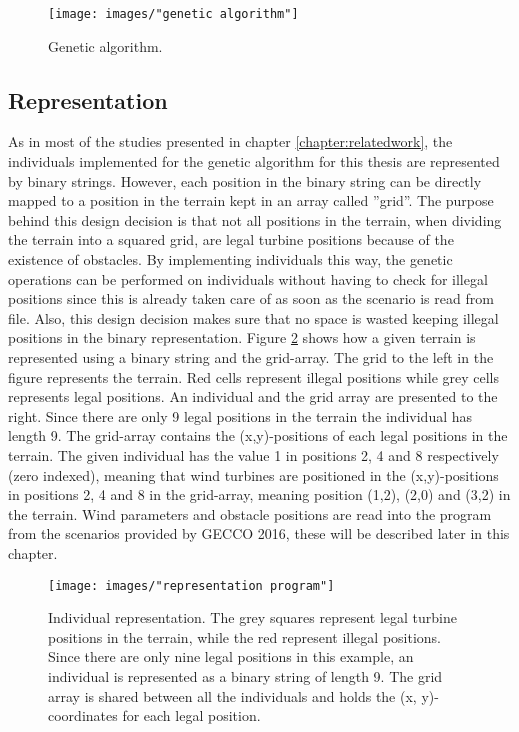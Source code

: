 \begin{figure}[h!]
\begin{center}
\texttt{[image: images/"genetic algorithm"]}
\caption{Genetic algorithm.}
\label{figure:genetic algorithm steps}
\end{center}
\end{figure}


\subsection{Representation}
As in most of the studies presented in chapter \ref{chapter:relatedwork}, the individuals implemented for the genetic algorithm for this thesis are represented by binary strings. However, each position in the binary string can be directly mapped to a position in the terrain kept in an array called ''grid''. The purpose behind this design decision is that not all positions in the terrain, when dividing the terrain into a squared grid, are legal turbine positions because of the existence of obstacles. By implementing individuals this way, the genetic operations can be performed on individuals without having to check for illegal positions since this is already taken care of as soon as the scenario is read from file. Also, this design decision makes sure that no space is wasted keeping illegal positions in the binary representation. Figure \ref{figure:representation} shows how a given terrain is represented using a binary string and the grid-array. The grid to the left in the figure represents the terrain. Red cells represent illegal positions while grey cells represents legal positions. An individual and the grid array are presented to the right. Since there are only 9 legal positions in the terrain the individual has length 9. The grid-array contains the (x,y)-positions of each legal positions in the terrain. The given individual has the value 1 in positions 2, 4 and 8 respectively (zero indexed), meaning that wind turbines are positioned in the (x,y)-positions in positions 2, 4 and 8 in the grid-array, meaning position (1,2), (2,0) and (3,2) in the terrain. Wind parameters and obstacle positions are read into the program from the scenarios provided by GECCO 2016, these will be described later in this chapter.


\begin{figure}[h!]
\begin{center}
\texttt{[image: images/"representation program"]}
\caption{Individual representation. The grey squares represent legal turbine positions in the terrain, while the red represent illegal positions. Since there are only nine legal positions in this example, an individual is represented as a binary string of length 9. The grid array is shared between all the individuals and holds the (x, y)-coordinates for each legal position.}
\label{figure:representation}
\end{center}
\end{figure}


